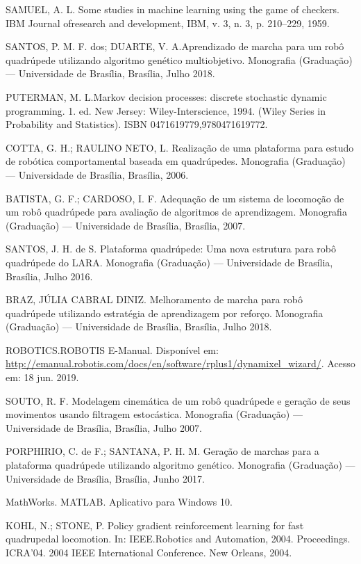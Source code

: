 \documentclass[12pt]{report}
\begin{document}
\begin{thebibliography}{12}

	 SAMUEL, A. L. Some studies in machine learning using the game of checkers. IBM Journal ofresearch and development, IBM, v. 3, n. 3, p. 210–229, 1959.
	
	 SANTOS, P. M. F. dos; DUARTE, V. A.Aprendizado de marcha para um robô quadrúpede utilizando algoritmo genético multiobjetivo. Monografia (Graduação) — Universidade de Brasília, Brasília, Julho 2018.
	
	 PUTERMAN, M. L.Markov decision processes:  discrete stochastic dynamic programming. 1. ed. New Jersey:  Wiley-Interscience, 1994. (Wiley Series in Probability and Statistics). ISBN 0471619779,9780471619772.
	
	 COTTA, G. H.; RAULINO NETO, L. Realização de uma plataforma para estudo de robótica comportamental baseada em quadrúpedes. Monografia (Graduação) — Universidade de Brasília, Brasília, 2006.
	 
	 BATISTA, G. F.; CARDOSO, I. F. Adequação de um sistema de locomoção de um robô quadrúpede para avaliação de algoritmos de aprendizagem. Monografia (Graduação) — Universidade de Brasília, Brasília, 2007.
	 
	 SANTOS, J. H. de S. Plataforma quadrúpede: Uma nova estrutura para robô quadrúpede do LARA. Monografia (Graduação) — Universidade de Brasília, Brasília, Julho 2016.

     BRAZ, JÚLIA CABRAL DINIZ. Melhoramento de marcha para robô quadrúpede utilizando estratégia de aprendizagem por reforço. Monografia (Graduação) — Universidade de Brasília, Brasília, Julho 2018.
    
     ROBOTICS.ROBOTIS E-Manual. Disponível em: \url{http://emanual.robotis.com/docs/en/software/rplus1/dynamixel\_wizard/}. Acesso em: 18 jun. 2019.
    
     SOUTO, R. F. Modelagem cinemática de um robô quadrúpede e geração de seus movimentos usando filtragem estocástica. Monografia (Graduação) — Universidade de Brasília, Brasília, Julho 2007.
    
     PORPHIRIO, C. de F.; SANTANA, P. H. M. Geração de marchas para a plataforma quadrúpede utilizando algoritmo genético. Monografia (Graduação) — Universidade de Brasília, Brasília, Junho 2017.
    
     MathWorks. MATLAB. Aplicativo para Windows 10.
    
     KOHL, N.; STONE, P. Policy gradient reinforcement learning for fast quadrupedal locomotion. In: IEEE.Robotics and Automation, 2004. Proceedings. ICRA’04. 2004 IEEE International Conference. New Orleans, 2004.
    
\end{thebibliography}
\end{document}

